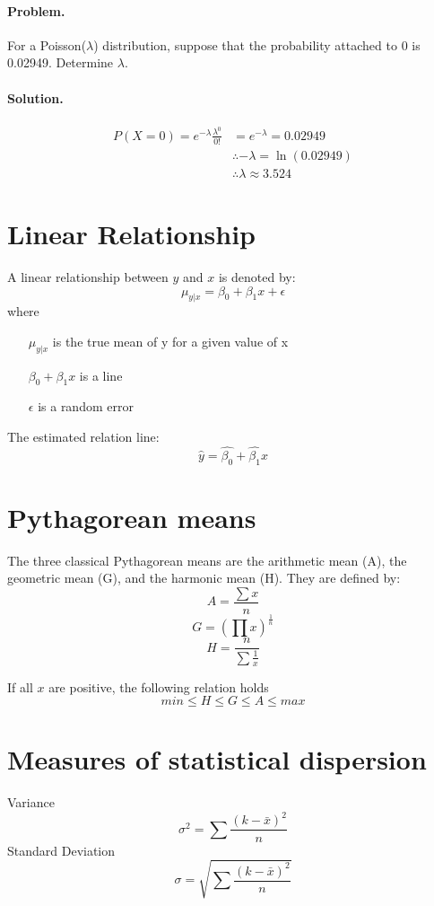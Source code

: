 \documentclass[oneside]{book}
\newcommand*\mean[1]{\bar{#1}}
\newcommand*\reciprocal[1]{\frac{1}{#1}}
\begin{document}
\paragraph{Problem.}
For a Poisson(\(\lambda\)) distribution, suppose that the probability
attached to 0 is 0.02949. Determine \(\lambda\).
\paragraph{Solution.}
\begin{align*}
P(X = 0) = e^{-\lambda}\frac{\lambda^0}{0!} &= e^{-\lambda} = 0.02949 \\
& \therefore -\lambda = \ln \left(0.02949\right)\\
& \therefore \lambda \approx 3.524
\end{align*}

\section{Linear Relationship}
A linear relationship between \(y\) and \(x\) is denoted by:
\[\mu_{y | x} = \beta_0 + \beta_1 x + \epsilon\]
where
\begin{itemize}
  \item[\(\mu_{y | x}\)] is the true mean of y for a given value of x
  \item[\(\beta_0 + \beta_1 x\)] is a line
  \item[\(\epsilon\)] is a random error
\end{itemize}

The estimated relation line:
\[\hat y = \hat {\beta_0} + \hat {\beta_1} x\]

\section{Pythagorean means}
The three classical Pythagorean means are the arithmetic mean (A), the
geometric mean (G), and the harmonic mean (H). They are defined by:
\[A = \frac{\sum{x}}{n}\]
\[G = \left( \prod{x} \right) ^ \reciprocal{n}\]
\[H = \frac{n}{\sum{\reciprocal{x}}}\]

If all \(x\) are positive, the following relation holds
\[min \le H \le G \le A \le max\]

\section{Measures of statistical dispersion}
Variance
\[\sigma^2 = \sum \frac{\left ( k-\mean{x} \right ) ^ 2}{n}\]
Standard Deviation
\[\sigma = \sqrt{\sum \frac{\left ( k-\mean{x} \right ) ^ 2}{n}}\]
\end{document}
